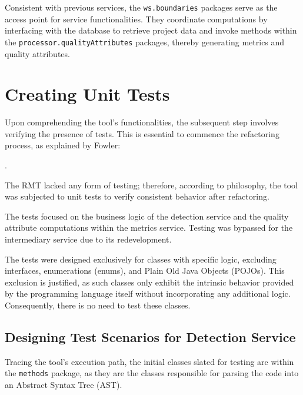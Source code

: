 Consistent with previous services, the \texttt{ws.boundaries} packages serve as the access point for service functionalities. They coordinate computations by interfacing with the database to retrieve project data and invoke methods within the \texttt{processor.qualityAttributes} packages, thereby generating metrics and quality attributes.
 
\section{Creating Unit Tests}
\label{sec-creating-tests}

Upon comprehending the tool's functionalities, the subsequent step involves verifying the presence of tests. This is essential to commence the refactoring process, as explained by Fowler:

.

The RMT lacked any form of testing; therefore, according to \textcite{fowler2018refactoring} philosophy, the tool was subjected to unit tests to verify consistent behavior after refactoring. 

The tests focused on the business logic of the detection service and the quality attribute computations within the metrics service. Testing was bypassed for the intermediary service due to its redevelopment.

The tests were designed exclusively for classes with specific logic, excluding interfaces, enumerations (enums), and Plain Old Java Objects (POJOs). This exclusion is justified, as such classes only exhibit the intrinsic behavior provided by the programming language itself without incorporating any additional logic. Consequently, there is no need to test these classes.

\subsection{Designing Test Scenarios for Detection Service}
\label{detection-design-tests}

Tracing the tool's execution path, the initial classes slated for testing are within the \texttt{methods} package, as they are the classes responsible for parsing the code into an Abstract Syntax Tree (AST). 

